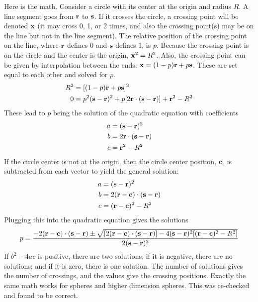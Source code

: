 \documentclass[11pt]{article}
\begin{document}
\begin{description}
Here is the math. Consider a circle with its center at the origin and radius $R$. A line segment goes from $\vb{r}$ to $\vb{s}$. If it crosses the circle, a crossing point will be denoted $\vb{x}$ (it may cross 0, 1, or 2 times, and also the crossing point(s) may be on the line but not in the line segment). The relative position of the crossing point on the line, where $\vb{r}$ defines 0 and $\vb{s}$ defines 1, is $p$. Because the crossing point is on the circle and the center is the origin, $\vb{x}^2 = R^2$. Also, the crossing point can be given by interpolation between the ends: $\vb{x} = (1-p)\vb{r} + p\vb{s}$. These are set equal to each other and solved for $p$.
\begin{align*}
R^2 &= [(1-p)\vb{r}+p\vb{s}]^2 \\
0 &= p^2(\vb{s}-\vb{r})^2+p[2\vb{r}\cdot (\vb{s}-\vb{r})]+\vb{r}^2 - R^2
\end{align*}
These lead to $p$ being the solution of the quadratic equation with coefficients
\begin{align*}
a &= (\vb{s}-\vb{r})^2 \\
b &= 2\vb{r} \cdot (\vb{s}-\vb{r}) \\
c &=\vb{r}^2 - R^2
\end{align*}
If the circle center is not at the origin, then the circle center position, $\vb{c}$, is subtracted from each vector to yield the general solution:
\begin{align*}
a &= (\vb{s}-\vb{r})^2 \\
b &= 2(\vb{r}-\vb{c}) \cdot (\vb{s}-\vb{r}) \\
c &=(\vb{r} -\vb{c})^2 - R^2
\end{align*}
Plugging this into the quadratic equation gives the solutions
$$p=\frac{-2(\vb{r}-\vb{c})\cdot (\vb{s}-\vb{r})\pm \sqrt{[2(\vb{r}-\vb{c})\cdot (\vb{s}-\vb{r})] - 4(\vb{s}-\vb{r})^2[(\vb{r}-\vb{c})^2-R^2]}}{2(\vb{s}-\vb{r})^2}$$
If $b^2-4ac$ is positive, there are two solutions; if it is negative, there are no solutions; and if it is zero, there is one solution. The number of solutions gives the number of crossings, and the values give the crossing positions. Exactly the same math works for spheres and higher dimension spheres. This was re-checked and found to be correct.


\end{description}
\end{document}
